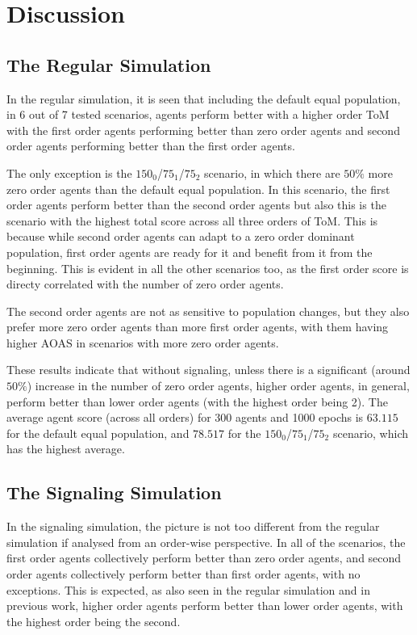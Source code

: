 \section{Discussion}\label{sec:discussion}

\subsection{The Regular Simulation}

In the regular simulation, it is seen that including the default equal population, in 6 out of 7 tested scenarios, agents perform better with a higher order ToM with the first order agents performing better than zero order agents and second order agents performing better than the first order agents. 

The only exception is the $150_{0}$/$75_{1}$/$75_{2}$ scenario, in which there are $50\%$ more zero order agents than the default equal population. In this scenario, the first order agents perform better than the second order agents but also this is the scenario with the highest total score across all three orders of ToM. This is because while second order agents can adapt to a zero order dominant population, first order agents are ready for it and benefit from it from the beginning. This is evident in all the other scenarios too, as the first order score is directy correlated with the number of zero order agents. 

The second order agents are not as sensitive to population changes, but they also prefer more zero order agents than more first order agents, with them having higher AOAS in scenarios with more zero order agents.

These results indicate that without signaling, unless there is a significant (around $50\%$) increase in the number of zero order agents, higher order agents, in general, perform better than lower order agents (with the highest order being 2). The average agent score (across all orders) for 300 agents and 1000 epochs is $\mathbf{63.115}$ for the default equal population, and $\mathbf{78.517}$ for the $150_{0}$/$75_{1}$/$75_{2}$ scenario, which has the highest average.

\subsection{The Signaling Simulation}

In the signaling simulation, the picture is not too different from the regular simulation if analysed from an order-wise perspective. In all of the scenarios, the first order agents collectively perform better than zero order agents, and second order agents collectively perform better than first order agents, with no exceptions. This is expected, as also seen in the regular simulation and in previous work, higher order agents perform better than lower order agents, with the highest order being the second.


